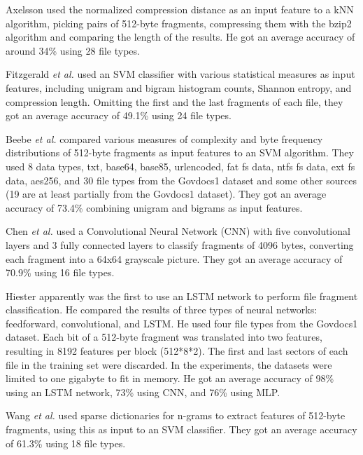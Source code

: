 
Axelsson \cite{axelsson_normalised_2010} used the normalized compression distance as an input feature to a kNN algorithm, picking pairs of 512-byte fragments, compressing them with the bzip2 algorithm and comparing the length of the results.
He got an average accuracy of around 34\% using 28 file types.

Fitzgerald \textit{et al.} \cite{fitzgerald_using_2012}  used an SVM classifier with various statistical measures as input features, including unigram and bigram histogram counts, Shannon entropy, and compression length.
Omitting the first and the last fragments of each file, they got an average accuracy of 49.1\% using 24 file types.

Beebe \textit{et al.} \cite{beebe_sceadan:_2013}
compared various measures of complexity and byte frequency distributions of 512-byte fragments as input features to an SVM algorithm. They used 8 data types, txt, base64, base85, urlencoded, fat fs data, ntfs fs data, ext fs data, aes256, and
30 file types
from the Govdocs1 dataset and some other sources (19 are at least partially from the Govdocs1 dataset). They got an average accuracy of 73.4\% combining unigram and bigrams as input features.

Chen \textit{et al.} \cite{chen_file_2018}
used a Convolutional Neural Network (CNN) with five convolutional layers and 3 fully connected layers to classify fragments of 4096 bytes, converting each fragment into a 64x64 grayscale picture.
They got an average accuracy of 70.9\% using 16 file types.

Hiester \cite{hiester_file_2018} apparently was the first to use an LSTM network to perform file fragment classification. He compared the results of three types of neural networks: feedforward, convolutional, and LSTM. He used four file types from the Govdocs1 dataset.
Each bit of a 512-byte fragment was translated into two features, resulting in 8192 features per block (512*8*2). The first and last sectors of each file in the training set were discarded. In the experiments, the datasets were limited to one gigabyte to fit in memory. He got an average accuracy of 98\% using an LSTM network, 73\% using CNN, and 76\% using MLP.

Wang \textit{et al.} \cite{wang_sparse_2018} 
used sparse dictionaries for n-grams to extract features of 512-byte fragments, using this as input to an SVM classifier.
They got an average accuracy of 61.3\% using 18 file types.

